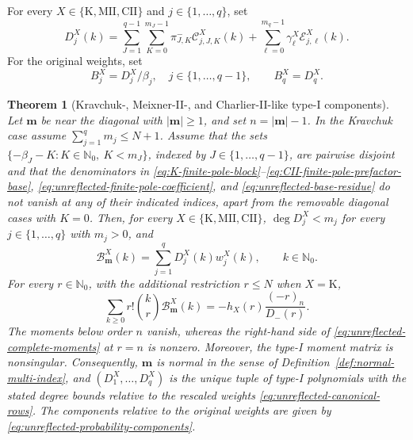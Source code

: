 \documentclass[10pt]{amsart}
\newcommand{\Nzero}{\mathbb N_0}
\newcommand{\mm}{\boldsymbol m}
\newcommand{\abs}[1]{\lvert#1\rvert}
\theoremstyle{plain}
\newtheorem{theorem}{Theorem}[section]
\theoremstyle{definition}
\theoremstyle{remark}
\begin{document}
For every \(X\in\{\mathrm K,\mathrm{MII},\mathrm{CII}\}\) and
\(j\in\{1,\ldots,q\}\), set
\begin{equation}
 D_j^X(k)=
 \sum_{J=1}^{q-1}\sum_{K=0}^{m_J-1}
 \pi_{J,K}^{-}\mathcal C_{j,J,K}^X(k)
 +\sum_{\ell=0}^{m_q-1}
 \gamma_\ell^X\mathcal E_{j,\ell}^X(k).
 \label{eq:unreflected-explicit-components}
\end{equation}
For the original weights, set
\begin{equation}
 B_j^X=D_j^X/\beta_j,\quad j\in\{1,\ldots,q-1\},
 \qquad B_q^X=D_q^X.
 \label{eq:unreflected-probability-components}
\end{equation}

\begin{theorem}[Kravchuk-, Meixner-II-, and Charlier-II-like type-I components]
\label{thm:explicit-unreflected-B}
Let \(\mm\) be near the diagonal with \(\abs\mm\ge1\), and set
\(n=\abs\mm-1\). In the Kravchuk case assume
\(\sum_{j=1}^q m_j\le N+1\). Assume that the sets
\(\{-\beta_J-K:K\in\Nzero,\ K<m_J\}\), indexed by
\(J\in\{1,\ldots,q-1\}\), are pairwise disjoint and that
the denominators in
\eqref{eq:K-finite-pole-block}--\eqref{eq:CII-finite-pole-prefactor-base},
\eqref{eq:unreflected-finite-pole-coefficient}, and
\eqref{eq:unreflected-base-residue} do not vanish at any of their indicated
indices, apart from the removable diagonal cases with \(K=0\). Then, for
every \(X\in\{\mathrm K,\mathrm{MII},\mathrm{CII}\}\),
\(\deg D_j^X<m_j\) for every
\(j\in\{1,\ldots,q\}\) with \(m_j>0\), and
\begin{equation}
 \mathcal B_{\mm}^X(k)=\sum_{j=1}^qD_j^X(k)w_j^X(k),
 \qquad k\in\Nzero.
 \label{eq:unreflected-component-decomposition}
\end{equation}
For every \(r\in\Nzero\), with the additional restriction \(r\le N\)
when \(X=\mathrm K\),
\begin{equation}
 \sum_{k\ge0}r!\binom{k}{r}\mathcal B_{\mm}^X(k)
 =-h_X(r)\frac{(-r)_n}{D_-(r)}.
 \label{eq:unreflected-complete-moments}
\end{equation}
The moments below order \(n\) vanish, whereas the right-hand side of
\eqref{eq:unreflected-complete-moments} at \(r=n\) is nonzero. Moreover,
the type-I moment matrix is nonsingular. Consequently, \(\mm\) is normal
in the sense of Definition~\ref{def:normal-multi-index}, and
\((D_1^X,\ldots,D_q^X)\) is the unique tuple of type-I polynomials with
the stated degree bounds relative to the rescaled weights
\eqref{eq:unreflected-canonical-rows}. The components relative to the
original weights are given by \eqref{eq:unreflected-probability-components}.
\end{theorem}
\end{document}
